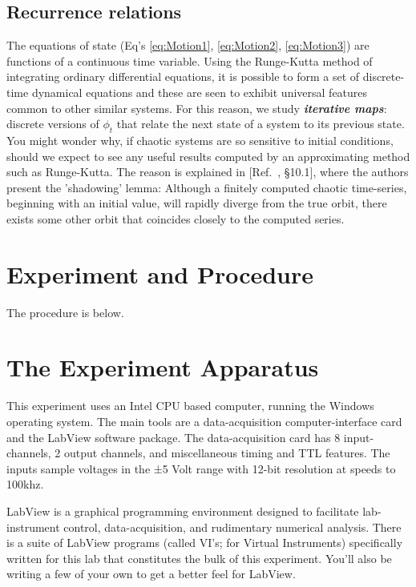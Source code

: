\documentclass{../lab}
\begin{document}
\subsection{Recurrence relations}

The equations of state (Eq's \eqref{eq:Motion1}, \eqref{eq:Motion2}, 
\eqref{eq:Motion3}) are functions of a continuous time variable. Using the Runge-Kutta method of integrating ordinary differential equations, it is possible to form a set of discrete-time dynamical equations and these are seen to exhibit universal features common to other similar systems. For this reason, we study \emph{\textbf{iterative maps}}: discrete versions of $ \phi_t $ that relate the next state of a system to its previous state. You might wonder why, if chaotic systems are so sensitive to initial conditions, should we expect to see any useful results computed by an approximating method such as Runge-Kutta. The reason is explained in [Ref.~\cite{Strogatz}, \S10.1], where the authors present the 'shadowing' lemma: Although a finitely computed chaotic time-series, beginning with an initial value, will rapidly diverge from the true orbit, there exists some other orbit that coincides closely to the computed series.

\section{Experiment and Procedure}

The procedure is below.

\section{The Experiment Apparatus}

This experiment uses an Intel CPU based computer, running the Windows operating system. The main tools are a data-acquisition computer-interface card and the LabView software package. The data-acquisition card has 8 input-channels, 2 output channels, and miscellaneous timing and TTL features. The inputs sample voltages in the ±5 Volt range with 12-bit resolution at speeds to 100khz.

LabView is a graphical programming environment designed to facilitate lab-instrument control, data-acquisition, and rudimentary numerical analysis. There is a suite of LabView programs (called VI's; for Virtual Instruments) specifically written for this lab that constitutes the bulk of this experiment. You'll also be writing a few of your own to get a better feel for LabView.
\end{document}
